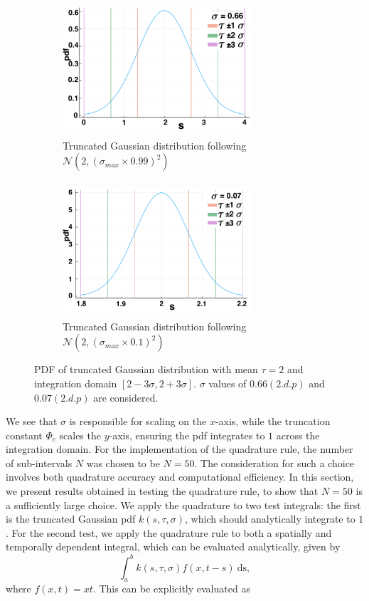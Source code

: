 \begin{figure}[H]
    \centering
    \begin{subfigure}[b]{0.45\textwidth}
        \centering
        \includegraphics[width=7cm,height=5cm]{t2sig1.png}
        \caption{Truncated Gaussian distribution following $\mathcal{N}(2,(\sigma_{max}\times0.99)^2)$}
        \label{}
    \end{subfigure}
    \hfill
    \begin{subfigure}[b]{0.45\textwidth}
        \centering
        \includegraphics[width=7cm,height=5cm]{t2sig2.png}
        \caption{Truncated Gaussian distribution following $\mathcal{N}(2,(\sigma_{max}\times0.1)^2)$}
        \label{}
    \end{subfigure}
    \caption{PDF of truncated Gaussian distribution with mean $\tau=2$ and integration domain $[2-3\sigma,2+3\sigma]$. $\sigma$ values of $0.66(2.d.p)$ and $0.07(2.d.p)$ are considered.}
    \label{fig:pdf2}
\end{figure}
We see that $\sigma$ is responsible for scaling on the $x$-axis, while the truncation constant $\Phi_c$ scales the $y$-axis, ensuring the pdf integrates to $1$ across the integration domain. For the implementation of the quadrature rule, the number of sub-intervals $N$ was chosen to be $N=50$. The consideration for such a choice involves both quadrature accuracy and computational efficiency. In this section, we present results obtained in testing the quadrature rule, to show that $N=50$ is a sufficiently large choice. We apply the quadrature to two test integrals: the first is the truncated Gaussian pdf $k(s,\tau,\sigma)$, which should analytically integrate to $1$. For the second test, we apply the quadrature rule to both a spatially and temporally dependent integral, which can be evaluated analytically, given by
\begin{equation}\label{testint}
\int_a^bk(s,\tau,\sigma)f(x,t-s)\ \text{ds},
\end{equation}
where $f(x,t)=xt$. This can be explicitly evaluated as

